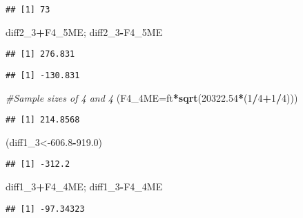 \documentclass[]{article}
\newenvironment{Shaded}{\begin{snugshade}}{\end{snugshade}}
\newcommand{\KeywordTok}[1]{\textcolor[rgb]{0.13,0.29,0.53}{\textbf{#1}}}
\newcommand{\DataTypeTok}[1]{\textcolor[rgb]{0.13,0.29,0.53}{#1}}
\newcommand{\DecValTok}[1]{\textcolor[rgb]{0.00,0.00,0.81}{#1}}
\newcommand{\FloatTok}[1]{\textcolor[rgb]{0.00,0.00,0.81}{#1}}
\newcommand{\CommentTok}[1]{\textcolor[rgb]{0.56,0.35,0.01}{\textit{#1}}}
\newcommand{\OperatorTok}[1]{\textcolor[rgb]{0.81,0.36,0.00}{\textbf{#1}}}
\newcommand{\NormalTok}[1]{#1}
\begin{document}
\begin{verbatim}
## [1] 73
\end{verbatim}

\begin{Shaded}
\begin{Highlighting}[]
\NormalTok{diff2_}\DecValTok{3}\OperatorTok{+}\NormalTok{F4_5ME; diff2_}\DecValTok{3}\OperatorTok{-}\NormalTok{F4_5ME}
\end{Highlighting}
\end{Shaded}

\begin{verbatim}
## [1] 276.831
\end{verbatim}

\begin{verbatim}
## [1] -130.831
\end{verbatim}

\begin{Shaded}
\begin{Highlighting}[]
\CommentTok{#Sample sizes of 4 and 4}
\NormalTok{(}\DataTypeTok{F4_4ME=}\NormalTok{ft}\OperatorTok{*}\KeywordTok{sqrt}\NormalTok{(}\FloatTok{20322.54}\OperatorTok{*}\NormalTok{(}\DecValTok{1}\OperatorTok{/}\DecValTok{4}\OperatorTok{+}\DecValTok{1}\OperatorTok{/}\DecValTok{4}\NormalTok{)))}
\end{Highlighting}
\end{Shaded}

\begin{verbatim}
## [1] 214.8568
\end{verbatim}

\begin{Shaded}
\begin{Highlighting}[]
\NormalTok{(diff1_}\DecValTok{3}\NormalTok{<-}\FloatTok{606.8}\OperatorTok{-}\FloatTok{919.0}\NormalTok{)}
\end{Highlighting}
\end{Shaded}

\begin{verbatim}
## [1] -312.2
\end{verbatim}

\begin{Shaded}
\begin{Highlighting}[]
\NormalTok{diff1_}\DecValTok{3}\OperatorTok{+}\NormalTok{F4_4ME; diff1_}\DecValTok{3}\OperatorTok{-}\NormalTok{F4_4ME}
\end{Highlighting}
\end{Shaded}

\begin{verbatim}
## [1] -97.34323
\end{verbatim}
\end{document}
